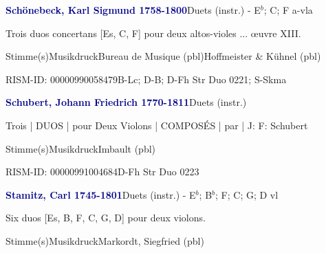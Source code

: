 \documentclass[twocolumn]{book}
\begin{document}
\par \vspace{7pt} \textcolor{darkblue}{\textbf{Schönebeck, Karl Sigmund  1758-1800}}\hfillplus{\textbf{[328]}}\newline Duets (instr.) - E$^b$; C; F a-vla
\par \begin{itshape}Trois duos concertans [Es, C, F] pour deux altos-violes ... œuvre XIII.\end{itshape} 
\par \textcolor{darkblue}{}  Stimme(s)\newline Musikdruck\newline Bureau de Musique  (pbl)\newline Hoffmeister \& Kühnel  (pbl)
\par RISM-ID: 00000990058479\newline B-Lc; D-B; D-Fh  Str Duo 0221; S-Skma
\par \vspace{7pt} \textcolor{darkblue}{\textbf{Schubert, Johann Friedrich  1770-1811}}\hfillplus{\textbf{[329]}}\newline Duets (instr.)
\par \begin{itshape}Trois | DUOS | pour Deux Violons | COMPOSÉS | par | J: F: Schubert\end{itshape} 
\par \textcolor{darkblue}{}  Stimme(s)\newline Musikdruck\newline Imbault  (pbl)
\par RISM-ID: 00000991004684\newline D-Fh  Str Duo 0223
\par \vspace{7pt} \textcolor{darkblue}{\textbf{Stamitz, Carl  1745-1801}}\hfillplus{\textbf{[330]}}\newline Duets (instr.) - E$^b$; B$^b$; F; C; G; D vl
\par \begin{itshape}Six duos [Es, B, F, C, G, D] pour deux violons.\end{itshape} 
\par \textcolor{darkblue}{}  Stimme(s)\newline Musikdruck\newline Markordt, Siegfried  (pbl)
\end{document}
